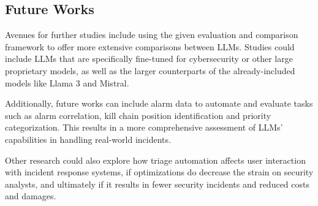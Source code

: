\subsection{Future Works}
\label{subsec:future-works}

Avenues for further studies include using the given evaluation and comparison framework to offer more extensive
comparisons between LLMs.
Studies could include LLMs that are specifically fine-tuned for cybersecurity or other large proprietary models, as
well as the larger counterparts of the already-included models like Llama 3 and Mistral.

Additionally, future works can include alarm data to automate and evaluate tasks such as alarm correlation, kill
chain position identification and priority categorization.
This results in a more comprehensive assessment of LLMs' capabilities in handling real-world incidents.

Other research could also explore how triage automation affects user interaction with incident response systems, if
optimizations do decrease the strain on security analysts, and ultimately if it results in fewer security incidents and
reduced costs and damages.